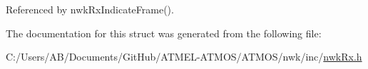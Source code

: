 Referenced by nwk\-Rx\-Indicate\-Frame().



The documentation for this struct was generated from the following file\-:\begin{DoxyCompactItemize}
\item 
C\-:/\-Users/\-A\-B/\-Documents/\-Git\-Hub/\-A\-T\-M\-E\-L-\/\-A\-T\-M\-O\-S/\-A\-T\-M\-O\-S/nwk/inc/\hyperlink{nwk_rx_8h}{nwk\-Rx.\-h}\end{DoxyCompactItemize}
